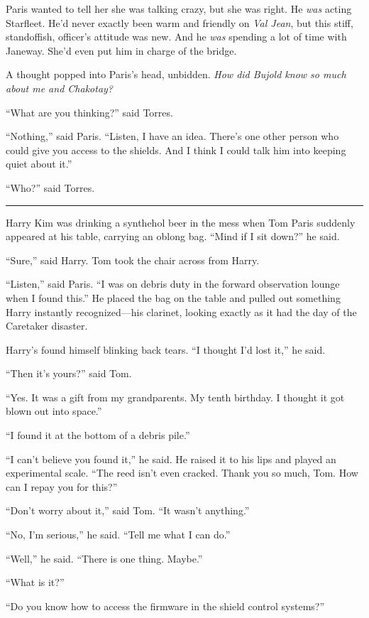\documentclass[twoside,letterpaper,12pt]{memoir}
\begin{document}
Paris wanted to tell her she was talking crazy, but she was right. He \textit{was} acting Starfleet. He'd never exactly been warm and friendly on \textit{Val Jean}, but this stiff, standoffish, officer's attitude was new. And he \textit{was} spending a lot of time with Janeway. She'd even put him in charge of the bridge.

A thought popped into Paris's head, unbidden. \textit{How did Bujold know so much about me and Chakotay?} 

``What are you thinking?'' said Torres. 

``Nothing,'' said Paris. ``Listen, I have an idea. There's one other person who could give you access to the shields. And I think I could talk him into keeping quiet about it.'' 

``Who?'' said Torres. 

\fancybreak{\rule{3cm}{0.4 pt}} 

Harry Kim was drinking a synthehol beer in the mess when Tom Paris suddenly appeared at his table, carrying an oblong bag. ``Mind if I sit down?'' he said. 

``Sure,'' said Harry. Tom took the chair across from Harry. 

``Listen,'' said Paris. ``I was on debris duty in the forward observation lounge when I found this.'' He placed the bag on the table and pulled out something Harry instantly recognized---his clarinet, looking exactly as it had the day of the Caretaker disaster. 

Harry's found himself blinking back tears. ``I thought I'd lost it,'' he said. 

``Then it's yours?'' said Tom. 

``Yes. It was a gift from my grandparents. My tenth birthday. I thought it got blown out into space.'' 

``I found it at the bottom of a debris pile.'' 

``I can't believe you found it,'' he said. He raised it to his lips and played an experimental scale. ``The reed isn't even cracked. Thank you so much, Tom. How can I repay you for this?'' 

``Don't worry about it,'' said Tom. ``It wasn't anything.'' 

``No, I'm serious,'' he said. ``Tell me what I can do.'' 

``Well,'' he said. ``There is one thing. Maybe.'' 

``What is it?'' 

``Do you know how to access the firmware in the shield control systems?'' 
\end{document}
